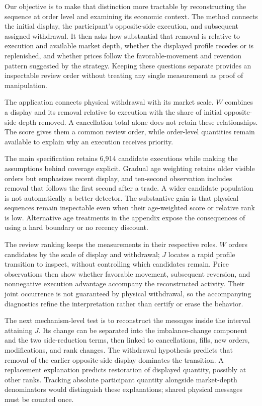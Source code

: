 \documentclass[11pt]{article}
\begin{document}
Our objective is to make that distinction more tractable by reconstructing the sequence at order level and examining its economic context. The method connects the initial display, the participant's opposite-side execution, and subsequent assigned withdrawal. It then asks how substantial that removal is relative to execution and available market depth, whether the displayed profile recedes or is replenished, and whether prices follow the favorable-movement and reversion pattern suggested by the strategy. Keeping these questions separate provides an inspectable review order without treating any single measurement as proof of manipulation.

The application connects physical withdrawal with its market scale. $W$ combines a display and its removal relative to execution with the share of initial opposite-side depth removed. A cancellation total alone does not retain these relationships. The score gives them a common review order, while order-level quantities remain available to explain why an execution receives priority.

The main specification retains 6,914 candidate executions while making the assumptions behind coverage explicit. Gradual age weighting retains older visible orders but emphasizes recent display, and ten-second observation includes removal that follows the first second after a trade. A wider candidate population is not automatically a better detector. The substantive gain is that physical sequences remain inspectable even when their age-weighted score or relative rank is low. Alternative age treatments in the appendix expose the consequences of using a hard boundary or no recency discount.

The review ranking keeps the measurements in their respective roles. $W$ orders candidates by the scale of display and withdrawal; $J$ locates a rapid profile transition to inspect, without controlling which candidates remain. Price observations then show whether favorable movement, subsequent reversion, and nonnegative execution advantage accompany the reconstructed activity. Their joint occurrence is not guaranteed by physical withdrawal, so the accompanying diagnostics refine the interpretation rather than certify or erase the behavior.

The next mechanism-level test is to reconstruct the messages inside the interval attaining $J$. Its change can be separated into the imbalance-change component and the two side-reduction terms, then linked to cancellations, fills, new orders, modifications, and rank changes. The withdrawal hypothesis predicts that removal of the earlier opposite-side display dominates the transition. A replacement explanation predicts restoration of displayed quantity, possibly at other ranks. Tracking absolute participant quantity alongside market-depth denominators would distinguish these explanations; shared physical messages must be counted once.
\end{document}
